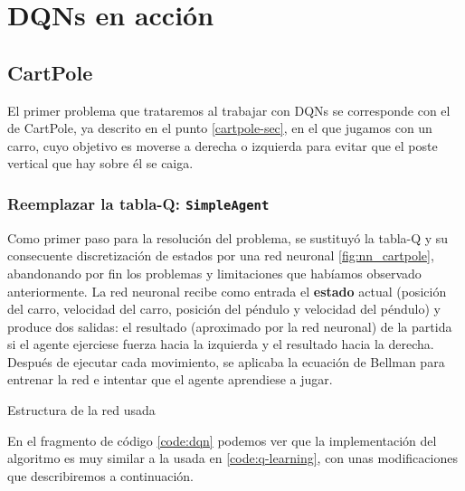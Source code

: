 \chapter{DQNs en acción}
\label{cap:dqnEnAccion}



\section{CartPole}
\label{sec:cartpoleDQN}

El primer problema que trataremos al trabajar con DQNs se corresponde con el de CartPole, ya descrito en el punto \ref{cartpole-sec}, en el que jugamos con un carro, cuyo objetivo es moverse a derecha o izquierda para evitar que el poste vertical que hay sobre él se caiga.


\subsection{Reemplazar la tabla-Q: \texttt{SimpleAgent}}

Como primer paso para la resolución del problema, se sustituyó la tabla-Q y su consecuente discretización de estados por una red neuronal \ref{fig:nn_cartpole}, abandonando por fin los problemas y limitaciones que habíamos observado anteriormente. La red neuronal recibe como entrada el \textbf{estado} actual (posición del carro, velocidad del carro, posición del péndulo y velocidad del péndulo) y produce dos salidas: el resultado (aproximado por la red neuronal) de la partida si el agente ejerciese fuerza hacia la izquierda y el resultado hacia la derecha. Después de ejecutar cada movimiento, se aplicaba la ecuación de Bellman para entrenar la red e intentar que el agente aprendiese a jugar.

%
       {Estructura de la red usada}

En el fragmento de código \ref{code:dqn} podemos ver que la implementación del algoritmo es muy similar a la usada en \ref{code:q-learning}, con unas modificaciones que describiremos a continuación.

